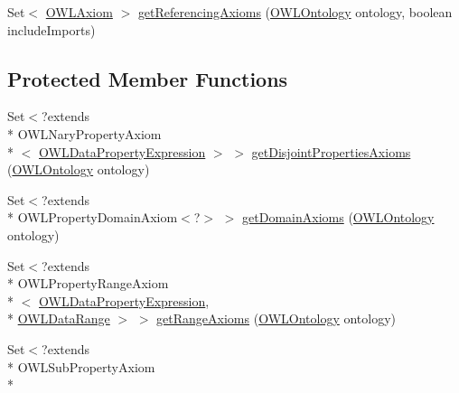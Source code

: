 \begin{DoxyCompactItemize}
\item 
Set$<$ \hyperlink{interfaceorg_1_1semanticweb_1_1owlapi_1_1model_1_1_o_w_l_axiom}{O\-W\-L\-Axiom} $>$ \hyperlink{classuk_1_1ac_1_1manchester_1_1cs_1_1owl_1_1owlapi_1_1_o_w_l_data_property_impl_ac9bf0ec252f98fc31be0a19e91a383d0}{get\-Referencing\-Axioms} (\hyperlink{interfaceorg_1_1semanticweb_1_1owlapi_1_1model_1_1_o_w_l_ontology}{O\-W\-L\-Ontology} ontology, boolean include\-Imports)
\end{DoxyCompactItemize}
\subsection*{Protected Member Functions}
\begin{DoxyCompactItemize}
\item 
Set$<$?extends \\*
O\-W\-L\-Nary\-Property\-Axiom\\*
$<$ \hyperlink{interfaceorg_1_1semanticweb_1_1owlapi_1_1model_1_1_o_w_l_data_property_expression}{O\-W\-L\-Data\-Property\-Expression} $>$ $>$ \hyperlink{classuk_1_1ac_1_1manchester_1_1cs_1_1owl_1_1owlapi_1_1_o_w_l_data_property_impl_af3736b47126a162a20692872fbd774e5}{get\-Disjoint\-Properties\-Axioms} (\hyperlink{interfaceorg_1_1semanticweb_1_1owlapi_1_1model_1_1_o_w_l_ontology}{O\-W\-L\-Ontology} ontology)
\item 
Set$<$?extends \\*
O\-W\-L\-Property\-Domain\-Axiom$<$?$>$ $>$ \hyperlink{classuk_1_1ac_1_1manchester_1_1cs_1_1owl_1_1owlapi_1_1_o_w_l_data_property_impl_af5d3dd5b8008f79fa4e80bb8fabe54fd}{get\-Domain\-Axioms} (\hyperlink{interfaceorg_1_1semanticweb_1_1owlapi_1_1model_1_1_o_w_l_ontology}{O\-W\-L\-Ontology} ontology)
\item 
Set$<$?extends \\*
O\-W\-L\-Property\-Range\-Axiom\\*
$<$ \hyperlink{interfaceorg_1_1semanticweb_1_1owlapi_1_1model_1_1_o_w_l_data_property_expression}{O\-W\-L\-Data\-Property\-Expression}, \\*
\hyperlink{interfaceorg_1_1semanticweb_1_1owlapi_1_1model_1_1_o_w_l_data_range}{O\-W\-L\-Data\-Range} $>$ $>$ \hyperlink{classuk_1_1ac_1_1manchester_1_1cs_1_1owl_1_1owlapi_1_1_o_w_l_data_property_impl_a42851f72d49eaedf3079aa5fe63289a3}{get\-Range\-Axioms} (\hyperlink{interfaceorg_1_1semanticweb_1_1owlapi_1_1model_1_1_o_w_l_ontology}{O\-W\-L\-Ontology} ontology)
\item 
Set$<$?extends \\*
O\-W\-L\-Sub\-Property\-Axiom\\*

\end{DoxyCompactItemize}
